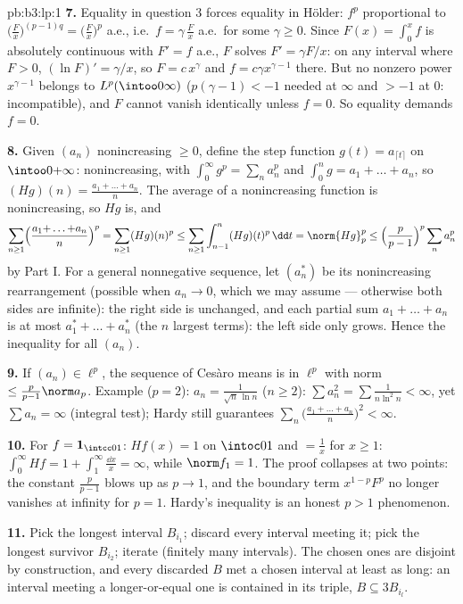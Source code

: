 \begin{solution}{pb:b3:lp:1}
\textbf{7.} Equality in question 3 forces equality in
H\"older: $f^p$ proportional to $\bigl(\frac Fx\bigr)^{(p-1)q}
= \bigl(\frac Fx\bigr)^p$ a.e., i.e.\ $f = \gamma\,\frac Fx$
a.e.\ for some $\gamma \geq 0$. Since $F(x) = \int_0^xf$ is
absolutely continuous with $F' = f$ a.e., $F$ solves $F' =
\gamma F/x$: on any interval where $F > 0$, $(\ln F)' =
\gamma/x$, so $F = c\,x^{\gamma}$ and $f = c\gamma
x^{\gamma - 1}$ there. But no nonzero power $x^{\gamma-1}$
belongs to $L^p(\intoo0\infty)$ ($p(\gamma - 1) < -1$ needed
at $\infty$ and $> -1$ at $0$: incompatible), and $F$ cannot
vanish identically unless $f = 0$. So equality demands $f =
0$.

\textbf{8.} Given $(a_n)$ nonincreasing $\geq 0$, define the
step function $g(t) = a_{\lceil t\rceil}$ on
$\intoo0{+\infty}$: nonincreasing, with $\int_0^\infty g^p =
\sum_na_n^p$ and $\int_0^ng = a_1 + \dots + a_n$, so
$(Hg)(n) = \frac{a_1 + \dots + a_n}n$. The average of a
nonincreasing function is nonincreasing, so $Hg$ is, and
\[
\sum_{n\geq1}\Bigl(\frac{a_1{+}\dots{+}a_n}n\Bigr)^p
= \sum_{n\geq1}(Hg)(n)^p
\leq \sum_{n\geq1}\int_{n-1}^n (Hg)(t)^p\,\dd t
= \norm{Hg}_p^p
\leq \Bigl(\frac p{p-1}\Bigr)^p\sum_n a_n^p
\]
by Part I. For a general nonnegative sequence, let $(a_n^*)$
be its nonincreasing rearrangement (possible when $a_n \to 0$,
which we may assume --- otherwise both sides are infinite):
the right side is unchanged, and each partial sum $a_1 + \dots
+ a_n$ is at most $a_1^* + \dots + a_n^*$ (the $n$ largest
terms): the left side only grows. Hence the inequality for all
$(a_n)$.

\textbf{9.} If $(a_n) \in \ell^p$, the sequence of Ces\`aro
means is in $\ell^p$ with norm $\leq \frac p{p-1}\norm
a_p$. Example ($p = 2$): $a_n = \frac1{\sqrt n\,\ln n}$ ($n
\geq 2$): $\sum a_n^2 = \sum\frac1{n\ln^2n} < \infty$, yet
$\sum a_n = \infty$ (integral test); Hardy still guarantees
$\sum_n\bigl(\frac{a_1 + \dots + a_n}n\bigr)^2 < \infty$.

\textbf{10.} For $f = \mathbf 1_{\intcc01}$: $Hf(x) = 1$ on
$\intoc01$ and $= \frac1x$ for $x \geq 1$: $\int_0^\infty Hf =
1 + \int_1^\infty\frac{\dd x}x = \infty$, while $\norm f_1 =
1$. The proof collapses at two points: the constant
$\frac p{p-1}$ blows up as $p \to 1$, and the boundary term
$x^{1-p}F^p$ no longer vanishes at infinity for $p = 1$.
Hardy's inequality is an honest $p > 1$ phenomenon.

\textbf{11.} Pick the longest interval $B_{i_1}$; discard
every interval meeting it; pick the longest survivor
$B_{i_2}$; iterate (finitely many intervals). The chosen ones
are disjoint by construction, and every discarded $B$ met a
chosen interval at least as long: an interval meeting a
longer-or-equal one is contained in its triple, $B \subseteq
3B_{i_l}$.


\end{solution}
